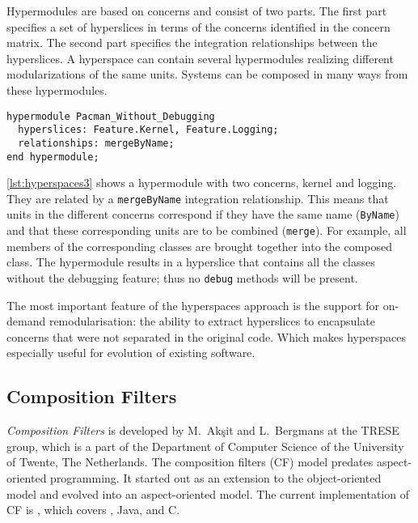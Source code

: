 Hypermodules are based on concerns and consist of two parts.
The first part specifies a set of hyperslices in terms of the concerns identified in the concern matrix.
The second part specifies the integration relationships between the hyperslices.
A hyperspace can contain several hypermodules realizing different modularizations of the same units.
Systems can be composed in many ways from these hypermodules.

\begin{lstlisting}[language={[HyperJ]Java},style=floatlisting,%
                   caption={Defining a hypermodule},label={lst:hyperspaces3},%
                   floatplacement=htbp]
hypermodule Pacman_Without_Debugging
  hyperslices: Feature.Kernel, Feature.Logging;
  relationships: mergeByName;
end hypermodule;
\end{lstlisting}

\autoref{lst:hyperspaces3} shows a hypermodule with two concerns, kernel and logging.
They are related by a \lstinline|mergeByName| integration relationship.
This means that units in the different concerns correspond if they have the same name (\lstinline|ByName|) and that these corresponding units are to be combined (\lstinline|merge|).
For example, all members of the corresponding classes are brought together into the composed class.
The hypermodule results in a hyperslice that contains all the classes without the debugging feature; thus no \lstinline|debug| methods will be present.

The most important feature of the hyperspaces approach is the support for on-demand remodularisation: the ability to extract hyperslices to encapsulate concerns that were not separated in the original code.
Which makes hyperspaces especially useful for evolution of existing software.

\subsection{Composition Filters}
\label{sec:Composition_Filters}

%
\emph{Composition Filters} is developed by M.~Ak\c{s}it and L.~Bergmans at the TRESE group, which is a part of the Department of Computer Science of the University of Twente, The Netherlands.
The composition filters (CF) model predates aspect-oriented programming.
It started out as an extension to the object-oriented model and evolved into an aspect-oriented model.
The current implementation of CF is \Compose*, which covers \dotNET, Java, and C.

